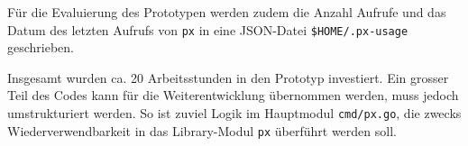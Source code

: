 Für die Evaluierung des Prototypen werden zudem die Anzahl Aufrufe und das Datum des letzten Aufrufs von \texttt{px} in eine JSON-Datei \texttt{\$HOME/.px-usage} geschrieben.

Insgesamt wurden ca. 20 Arbeitsstunden in den Prototyp investiert. Ein grosser Teil des Codes kann für die Weiterentwicklung übernommen werden, muss jedoch umstrukturiert werden. So ist zuviel Logik im Hauptmodul \texttt{cmd/px.go}, die zwecks Wiederverwendbarkeit in das Library-Modul \texttt{px} überführt werden soll.
